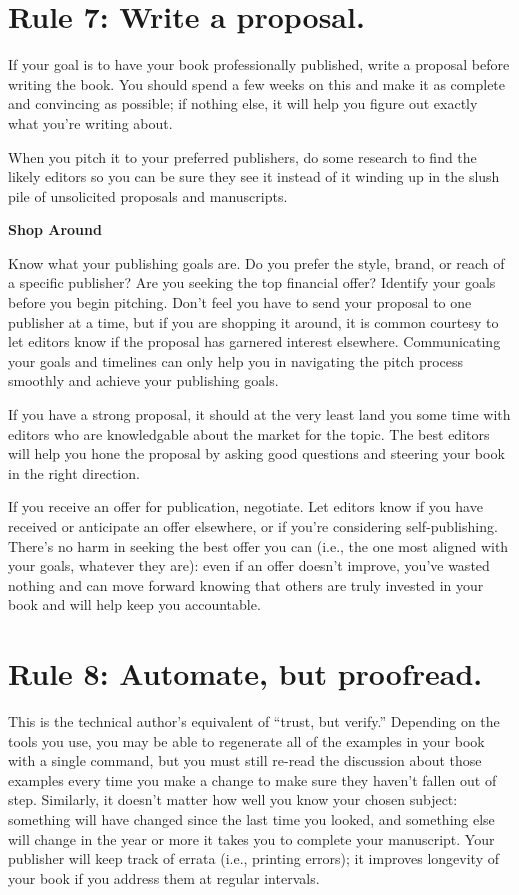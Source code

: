 \documentclass[10pt,letterpaper]{article}
\begin{document}
\section*{Rule 7: Write a proposal.}

If your goal is to have your book professionally published, write a
proposal before writing the book. You should spend a few weeks on this
and make it as complete and convincing as possible; if nothing else, it
will help you figure out exactly what you're writing about.

When you pitch it to your preferred publishers, do some research to find
the likely editors so you can be sure they see it instead of it winding
up in the slush pile of unsolicited proposals and manuscripts.

\begin{mdframed}
\textbf{Shop Around}

\noindent
Know what your publishing goals are. Do you prefer the style, brand, or
reach of a specific publisher? Are you seeking the top financial offer?
Identify your goals before you begin pitching. Don't feel you have to
send your proposal to one publisher at a time, but if you are shopping
it around, it is common courtesy to let editors know if the proposal has
garnered interest elsewhere. Communicating your goals and timelines can
only help you in navigating the pitch process smoothly and achieve your
publishing goals.
\end{mdframed}

If you have a strong proposal, it should at the very least land you some
time with editors who are knowledgable about the market for the topic.
The best editors will help you hone the proposal by asking good
questions and steering your book in the right direction.

If you receive an offer for publication, negotiate. Let editors know if
you have received or anticipate an offer elsewhere, or if you're
considering self-publishing. There's no harm in seeking the best offer
you can (i.e., the one most aligned with your goals, whatever they are):
even if an offer doesn't improve, you've wasted nothing and can move
forward knowing that others are truly invested in your book and will
help keep you accountable.

\section*{Rule 8: Automate, but proofread.}

This is the technical author's equivalent of ``trust, but verify.''
Depending on the tools you use, you may be able to regenerate all of the
examples in your book with a single command, but you must still re-read
the discussion about those examples every time you make a change to make
sure they haven't fallen out of step. Similarly, it doesn't matter how
well you know your chosen subject: something will have changed since the
last time you looked, and something else will change in the year or more
it takes you to complete your manuscript. Your publisher will keep track
of errata (i.e., printing errors); it improves longevity of your book if
you address them at regular intervals.
\end{document}
